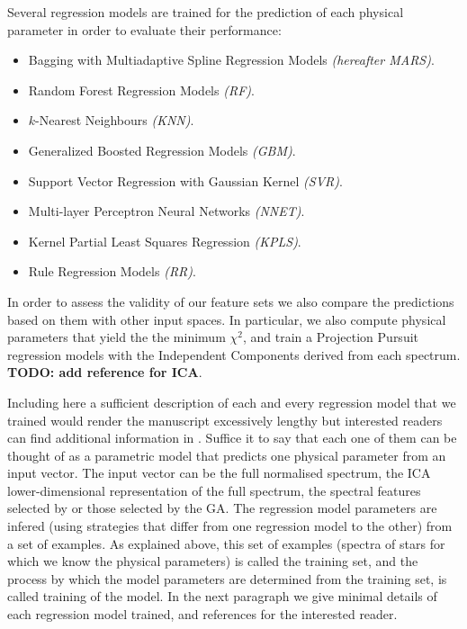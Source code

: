 {Several regression models are trained for the prediction of each
physical parameter in order to evaluate their performance:

\begin{itemize}

\item {Bagging with Multiadaptive Spline Regression Models \emph{(hereafter MARS)}.}

\item {Random Forest Regression Models \emph{(RF)}.}

\item {$k$-Nearest Neighbours \emph{(KNN)}.}

\item {Generalized Boosted Regression Models \emph{(GBM)}.}

\item {Support Vector Regression with Gaussian Kernel \emph{(SVR)}.}

\item {Multi-layer Perceptron Neural Networks \emph{(NNET)}.}

\item {Kernel Partial Least Squares Regression \emph{(KPLS)}.}

\item {Rule Regression Models \emph{(RR)}.}

\end{itemize}

In order to assess the validity of our feature sets we also compare
the predictions based on them with other input spaces. In particular,
we also compute physical parameters that yield the the minimum
$\chi^2$, and train a Projection Pursuit regression models with the
Independent Components derived from each spectrum. {\bf TODO: add
reference for ICA}.

Including here a sufficient description of each and every regression
model that we trained would render the manuscript excessively lengthy
but interested readers can find additional information in
\cite{baraud2002model,geman1992neural,elith2008working,meyer2003support,svetnik2003random}. Suffice it to say that each one of them can be thought of as
a parametric model that predicts one physical parameter from an input
vector. The input vector can be the full normalised spectrum, the ICA
lower-dimensional representation of the full spectrum, the spectral
features selected by \cite{cesetti} or those selected by the GA. The
regression model parameters are infered (using strategies that differ
from one regression model to the other) from a set of examples. As
explained above, this set of examples (spectra of stars for which we
know the physical parameters) is called the training set, and the
process by which the model parameters are determined from the training
set, is called training of the model. In the next paragraph we give
minimal details of each regression model trained, and references for
the interested reader.

}
